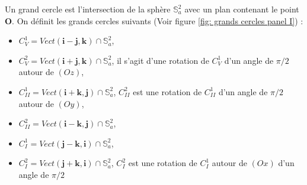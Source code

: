 Un grand cercle est l'intersection de la sphère $\mathbb{S}_a^2$ avec un plan contenant le point $\mathbf{O}$. On définit les grands cercles suivants (Voir figure \ref{fig: grands cercles panel I}) :

\begin{itemize}
\item $C_V^1 = Vect(\mathbf{i}-\mathbf{j}, \mathbf{k}) \cap \mathbb{S}_a^2$,
\item $C_V^2 = Vect(\mathbf{i}+\mathbf{j}, \mathbf{k}) \cap \mathbb{S}_a^2$, il s'agit d'une rotation de $C_V^1$ d'un angle de $\pi/2$ autour de $(Oz)$,
\item $C_{II}^1 = Vect(\mathbf{i}+\mathbf{k}, \mathbf{j}) \cap \mathbb{S}_a^2$, $C_{II}^2$ est une rotation de $C_{II}^1$ d'un angle de $\pi/2$ autour de $(Oy)$,
\item $C_{II}^2 = Vect(\mathbf{i}-\mathbf{k}, \mathbf{j}) \cap \mathbb{S}_a^2$,
\item $C_I^1=Vect(\mathbf{j}-\mathbf{k},\mathbf{i}) \cap \mathbb{S}_a^2$,
\item $C_I^2=Vect(\mathbf{j}+\mathbf{k},\mathbf{i}) \cap \mathbb{S}_a^2$, $C_I^2$ est une rotation de $C_I^1$ autour de $(Ox)$ d'un angle de $\pi/2$
\end{itemize}

